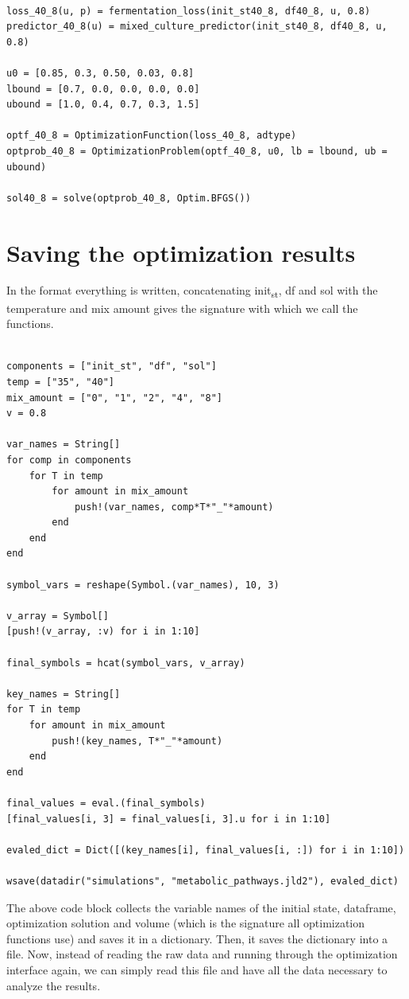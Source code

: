 \documentclass[11pt]{article}
\begin{document}
\begin{verbatim}

loss_40_8(u, p) = fermentation_loss(init_st40_8, df40_8, u, 0.8)
predictor_40_8(u) = mixed_culture_predictor(init_st40_8, df40_8, u, 0.8)

u0 = [0.85, 0.3, 0.50, 0.03, 0.8]
lbound = [0.7, 0.0, 0.0, 0.0, 0.0]
ubound = [1.0, 0.4, 0.7, 0.3, 1.5]

optf_40_8 = OptimizationFunction(loss_40_8, adtype)
optprob_40_8 = OptimizationProblem(optf_40_8, u0, lb = lbound, ub = ubound)

sol40_8 = solve(optprob_40_8, Optim.BFGS())
\end{verbatim}

\section{Saving the optimization results}
\label{sec:org1667490}
In the format everything is written, concatenating init\textsubscript{st}, df and sol with the temperature and mix amount gives the signature with which we call the functions.

\begin{verbatim}

components = ["init_st", "df", "sol"]
temp = ["35", "40"]
mix_amount = ["0", "1", "2", "4", "8"]
v = 0.8

var_names = String[]
for comp in components
    for T in temp
        for amount in mix_amount
            push!(var_names, comp*T*"_"*amount)
        end
    end
end

symbol_vars = reshape(Symbol.(var_names), 10, 3)

v_array = Symbol[]
[push!(v_array, :v) for i in 1:10]

final_symbols = hcat(symbol_vars, v_array)

key_names = String[]
for T in temp
    for amount in mix_amount
        push!(key_names, T*"_"*amount)
    end
end

final_values = eval.(final_symbols)
[final_values[i, 3] = final_values[i, 3].u for i in 1:10]

evaled_dict = Dict([(key_names[i], final_values[i, :]) for i in 1:10])

wsave(datadir("simulations", "metabolic_pathways.jld2"), evaled_dict)

\end{verbatim}

The above code block collects the variable names of the initial state, dataframe, optimization solution and volume (which is the signature all optimization functions use) and saves it in a dictionary. Then, it saves the dictionary into a file. Now, instead of reading the raw data and running through the optimization interface again, we can simply read this file and have all the data necessary to analyze the results.
\end{document}
